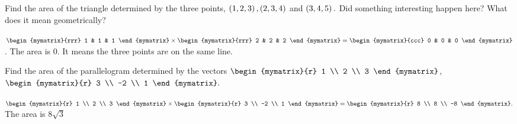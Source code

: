 \begin{enumialphparenastyle}
\begin{ex} Find the area of the triangle determined by the three points, $\left(
1,2,3\right) ,\left(2,3,4\right) $ and $\left(3,4,5\right) .$ Did
something interesting happen here? What does it mean geometrically?
\begin{sol}
$\begin{mymatrix}{rrr}
1 & 1 & 1
\end{mymatrix} \times \begin{mymatrix}{rrr}
 2 & 2 & 2
\end{mymatrix} =\begin{mymatrix}{ccc}
0 & 0 & 0
\end{mymatrix} $.  The area is 0. It means the three points are on the same line.
\end{sol}
\end{ex}

\begin{ex} Find the area of the parallelogram determined by the vectors $\begin{mymatrix}{r}
1 \\
2 \\
3
\end{mymatrix} $, $\begin{mymatrix}{r}
3 \\
-2 \\
1
\end{mymatrix} .$
\begin{sol}
$\begin{mymatrix}{r}
1 \\
2 \\
3
\end{mymatrix} \times
\begin{mymatrix}{r}
3 \\
-2 \\
1
\end{mymatrix} =\begin{mymatrix}{r}
8 \\
8 \\
-8
\end{mymatrix} .$ The area is $8\sqrt{3}$
\end{sol}
\end{ex}



\end{enumialphparenastyle}
